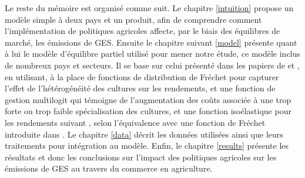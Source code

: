 Le reste du mémoire est organisé comme suit. Le chapitre \ref{intuition} propose un modèle simple à deux pays et un produit, afin de comprendre comment l’implémentation de politiques agricoles affecte, par le biais des équilibres de marché, les émissions de GES. Ensuite le chapitre suivant \ref{model} présente quant à lui le modèle d’équilibre partiel utilisé pour mener notre étude, ce modèle inclus de nombreux pays et secteurs. Il se base sur celui présenté dans les papiers de \cite{Gouel2021} et \cite{Gouel2025}, en utilisant, à la place de fonctions de distribution de Fréchet pour capturer l’effet de l’hétérogénéité des cultures sur les rendements, et une fonction de gestion multilogit qui témoigne de l’augmentation des coûts associée à une trop forte ou trop faible spécialisation des cultures, et une fonction isoélastique pour les rendements suivant \cite{Carpentier2013}, selon l'équivalence avec une fonction de Fréchet introduite dans \cite{Gouel202x}. Le chapitre \ref{data} décrit les données utilisées ainsi que leurs traitements pour intégration au modèle. Enfin, le chapitre \ref{results} présente les résultats et donc les conclusions sur l’impact des politiques agricoles sur les émissions de GES au travers du commerce en agriculture.
